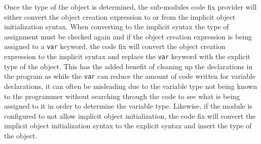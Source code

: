 Once the type of the object is determined, the sub-modules code fix provider will either convert the object creation expression to or from the implicit object initialization syntax. When converting to the implicit syntax the type of assignment must be checked again and if the object creation expression is being assigned to a \texttt{var} keyword, the code fix will convert the object creation expression to the implicit syntax and replace the \texttt{var} keyword with the explicit type of the object. This has the added benefit of cleaning up the declarations in the program as while the \texttt{var} can reduce the amount of code written for variable declarations, it can often be misleading due to the variable type not being known to the programmer without searching through the code to see what is being assigned to it in order to determine the variable type. Likewise, if the module is configured to not allow implicit object initialization, the code fix will convert the implicit object initialization syntax to the explicit syntax and insert the type of the object.
